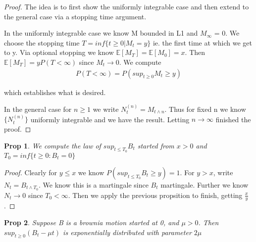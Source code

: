 \documentclass[11pt]{article}
\newcommand{\E}{\mathbb{E}}
\newtheorem{prop}{Prop}
\begin{document}
\begin{proof}
	The idea is to first show the uniformly integrable case and then extend to the general case via a stopping time argument.


	In the uniformly integrable case we know M bounded in L1 and $M_{\infty}$ = 0. We choose the stopping time $T = inf\{t \geq 0 | M_t = y\}$ ie. the first time at which we get to y. Via optional stopping we know $\E[M_T] = \E[M_0] = x$. Then $\E[M_T] = yP(T < \infty)$ since $M_t \to 0$. We compute
	\begin{align*}
		P(T < \infty) = P(sup_{t \geq 0} M_t \geq y)
	\end{align*}

	which establishes what is desired.

	In the general case for $n \geq 1$ we write $N_t^{(n)} = M_{t \wedge n}$. Thus for fixed n we know $\{N_t^{(n)}\}$ uniformly integrable and we have the result. Letting $n \to \infty$ finished the proof.
\end{proof}

\begin{prop}
	We compute the law of $sup_{t \leq T_0} B_t$ started from $x > 0$ and $T_0 = inf\{t \geq 0 : B_t = 0\}$
\end{prop}

\begin{proof}
	Clearly for $y \leq x$ we know $P(sup_{t \leq T_0} B_t \geq y) = 1$. For $y > x$, write $N_t = B_{t \wedge T_0}$. We know this is a martingale since $B_t$ martingale. Further we know $N_t \to 0$ since $T_0 < \infty$. Then we apply the previous propsition to finish, getting $\frac{x}{y}$.
\end{proof}

\begin{prop}
	Suppose B is a brownia motion started at 0, and $\mu > 0$. Then $sup_{t \geq 0}(B_t - \mu t)$ is exponentially distributed with parameter $2 \mu$
\end{prop}
\end{document}
